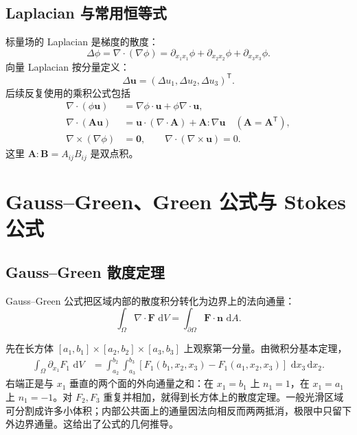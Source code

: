 \documentclass[cn,hazy,blue,11pt,normal]{elegantnote}
\numberwithin{equation}{section}
\newcommand{\dd}{\,\mathrm d}
\newcommand{\vct}[1]{\bm{#1}}
\newcommand{\ten}[1]{\bm{#1}}
\begin{document}
\subsection{Laplacian 与常用恒等式}

标量场的 Laplacian 是梯度的散度：
\begin{equation}
 \boxed{\Delta\phi=\nabla\cdot(\nabla\phi)
 =\partial_{x_1x_1}\phi+\partial_{x_2x_2}\phi+
 \partial_{x_3x_3}\phi.}
\end{equation}
向量 Laplacian 按分量定义：
\begin{equation}
 \Delta\vct u=(\Delta u_1,\Delta u_2,\Delta u_3)^{\mathsf T}.
\end{equation}
后续反复使用的乘积公式包括
\begin{align}
 \nabla\cdot(\phi\vct u)
 &=\nabla\phi\cdot\vct u+\phi\nabla\cdot\vct u, \label{eq:product-div-vector}\\
 \nabla\cdot(\ten A\vct u)
 &=\vct u\cdot(\nabla\cdot\ten A)+\ten A:\nabla\vct u
 \quad(\ten A=\ten A^{\mathsf T}), \label{eq:product-div-tensor}\\
 \nabla\times(\nabla\phi)&=\vct0,
 \qquad \nabla\cdot(\nabla\times\vct u)=0. \label{eq:curl-identities}
\end{align}
这里 $\ten A:\ten B=A_{ij}B_{ij}$ 是双点积。

\section{Gauss--Green、Green 公式与 Stokes 公式}

\subsection{Gauss--Green 散度定理}

Gauss--Green 公式把区域内部的散度积分转化为边界上的法向通量：
\begin{equation}
 \boxed{\int_\Omega\nabla\cdot\vct F\,\dd V
 =\int_{\partial\Omega}\vct F\cdot\vct n\,\dd A.} \label{eq:gauss-green}
\end{equation}

先在长方体 $[a_1,b_1]\times[a_2,b_2]\times[a_3,b_3]$ 上观察第一分量。由微积分基本定理，
\begin{align}
 \int_\Omega\partial_{x_1}F_1\,\dd V
 &=\int_{a_2}^{b_2}\int_{a_3}^{b_3}
 [F_1(b_1,x_2,x_3)-F_1(a_1,x_2,x_3)]\,\dd x_3\dd x_2.
\end{align}
右端正是与 $x_1$ 垂直的两个面的外向通量之和：在 $x_1=b_1$ 上 $n_1=1$，在 $x_1=a_1$ 上 $n_1=-1$。对 $F_2,F_3$ 重复并相加，就得到长方体上的散度定理。一般光滑区域可分割成许多小体积；内部公共面上的通量因法向相反而两两抵消，极限中只留下外边界通量。这给出了公式的几何推导。
\end{document}
